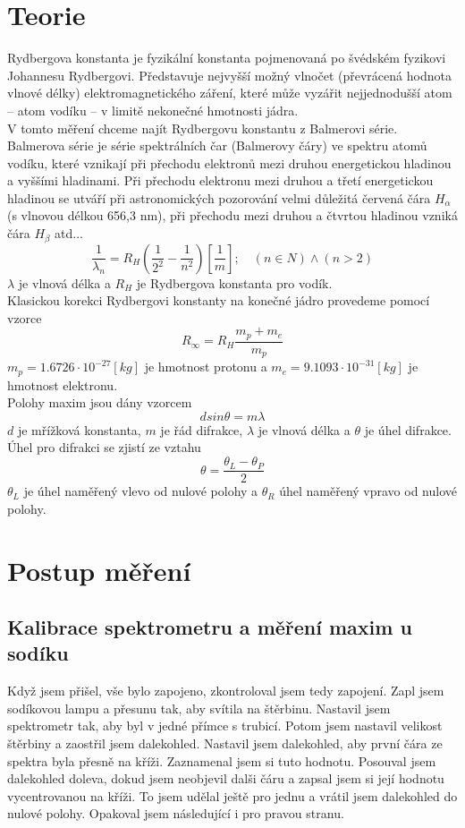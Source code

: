 \documentclass{article}
\begin{document}
\section{Teorie}
Rydbergova konstanta je fyzikální konstanta pojmenovaná po švédském fyzikovi Johannesu Rydbergovi. Představuje nejvyšší možný vlnočet (převrácená hodnota vlnové délky) elektromagnetického záření, které může vyzářit nejjednodušší atom – atom vodíku – v limitě nekonečné hmotnosti jádra.\\
V tomto měření chceme najít Rydbergovu konstantu z Balmerovi série.\\
Balmerova série je série spektrálních čar (Balmerovy čáry) ve spektru atomů vodíku, které vznikají při přechodu elektronů mezi druhou energetickou hladinou a vyššími hladinami. Při přechodu elektronu mezi druhou a třetí energetickou hladinou se utváří při astronomických pozorování velmi důležitá červená čára $H_{\alpha}$ (s vlnovou délkou 656,3 nm), při přechodu mezi druhou a čtvrtou hladinou vzniká čára $H_{\beta}$ atd...
\begin{equation}
  \frac{1}{\lambda_{n}} = R_{H} \left( \frac{1}{2^{2}} - \frac{1}{n^{2}} \right) \left[\frac{1}{m}\right] ; \quad (n \in N) \land (n > 2)
\end{equation}
$\lambda$ je vlnová délka a $R_{H}$ je Rydbergova konstanta pro vodík.\\
Klasickou korekci Rydbergovi konstanty na konečné jádro provedeme pomocí vzorce
\begin{equation}
  R_{\infty} = R_{H} \frac{m_{p} + m_{e}}{m_{p}}
\end{equation}
$m_{p} = 1.6726 \cdot 10^{-27}[kg]$ je hmotnost protonu a $m_{e} = 9.1093 \cdot 10^{-31}[kg]$ je hmotnost elektronu.\\
Polohy maxim jsou dány vzorcem
\begin{equation}
  d sin \theta = m \lambda
\end{equation}
$d$ je mřížková konstanta, $m$ je řád difrakce, $\lambda$ je vlnová délka a $\theta$ je úhel difrakce.
Úhel pro difrakci se zjistí ze vztahu
\begin{equation}
  \theta = \frac{\theta_{L} - \theta_{P}}{2}
\end{equation}
$\theta_{L}$ je úhel naměřený vlevo od nulové polohy a $\theta_{R}$ úhel naměřený vpravo od nulové polohy.
\section{Postup měření}
\subsection{Kalibrace spektrometru a měření maxim u sodíku}
Když jsem přišel, vše bylo zapojeno, zkontroloval jsem tedy zapojení.
Zapl jsem sodíkovou lampu a přesunu tak, aby svítila na štěrbinu.
Nastavil jsem spektrometr tak, aby byl v jedné přímce s trubicí.
Potom jsem nastavil velikost štěrbiny a zaostřil jsem dalekohled.
Nastavil jsem dalekohled, aby první čára ze spektra byla přesně na kříži.
Zaznamenal jsem si tuto hodnotu.
Posouval jsem dalekohled doleva, dokud jsem neobjevil dalši čáru
a zapsal jsem si její hodnotu vycentrovanou na kříži.
To jsem udělal ještě pro jednu a vrátil jsem dalekohled do nulové polohy.
Opakoval jsem následující i pro pravou stranu.
\end{document}
